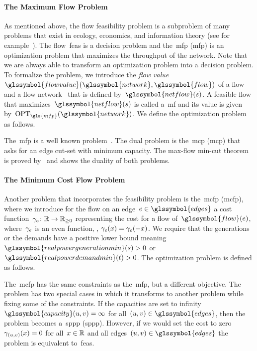 \paragraph{The Maximum Flow Problem}
\label{ch:foundations:sec:graph-theoretical-flows:para:maximum-flow-problem}
% 
As mentioned above, the flow feasibility problem is a subproblem of many
problems that exist in ecology, economics, and information theory (see for
example~\textcite{Ahu93}). The flow~\gls{feas} is a decision problem and
the~\acrlong{mfp} (\gls{mfp}) is an optimization problem that maximizes the
throughput of the network. Note that we are always able to transform an
optimization problem into a decision problem. To formalize the problem, we
introduce the \emph{flow value}~$\glssymbol{flowvalue}(\glssymbol{network},
\glssymbol{flow})$ of a flow~ and a flow
network~ that is defined by~$\glssymbol{netflow}(\source)$. A
feasible flow~ that maximizes~$\glssymbol{netflow}(\source)$ is
called a~\acrlong{mf} and its value is given
by~$\opt_{\gls{mfp}}(\glssymbol{network})$. We define the optimization problem
as follows.
% 
\begingroup
    
    \label{ch:fundamentals:problems:MF-Optimization_Problem}
\endgroup
% 
The~\gls{mfp} is a well known problem~\parencite[pp.19ff.]{Gol89b}. The dual 
problem is the~\acrlong{mcp} (\gls{mcp}) that asks for an edge cut-set with
minimum capacity. The max-flow min-cut theorem is proved by~\textcite{Dan57} and
shows the duality of both problems.
% 
\paragraph{The Minimum Cost Flow Problem}
\label{ch:foundations:sec:graph-theoretical-flows:para:minimum-cost-flow-problem}
% 
Another problem that incorporates the feasibility problem is the~\acrlong{mcfp}
(\gls{mcfp}), where we introduce for the flow on an
edge~$\edge\in\glssymbol{edges}$ a cost
function~$\gamma_e\colon\mathbb{R}\to\mathbb{R}_{\ge0}$ representing the cost for a flow
of~$\glssymbol{flow}(\edge)$, where~$\gamma_e$ is an even function, \ie,
$\gamma_e(x) = \gamma_e(-x)$. We require that the generations or
the demands have a positive lower bound meaning~$
\glssymbol{realpowergenerationmin}(\source)
 > 0$ or~$\glssymbol{realpowerdemandmin}(\sink) > 0$. The
 optimization problem is defined as follows.
% 
\begingroup
    
    \label{ch:fundamentals:problems:MCF-Optimization_Problem}
\endgroup
% 
The~\gls{mcfp} has the same constraints as the~\gls{mfp}, but a different
objective. The problem has two special cases in which it transforms to another
problem while fixing some of the constraints. If the capacities are set to
infinity~$\glssymbol{capacity}(\vertexa,\vertexb)=\infty$ for
all~$(\vertexa,\vertexb)\in\glssymbol{edges}$, then the problem becomes
a~\acrlong{sppp} (\gls{sppp}). However, if we would set the cost to
zero~$\gamma_{(u,v)}(x) = 0$ for all~$x\in\mathbb{R}$ and all edges~$
(\vertexa,\vertexb)\in\glssymbol{edges}$ the problem is equivalent
to~\gls{feas}.

